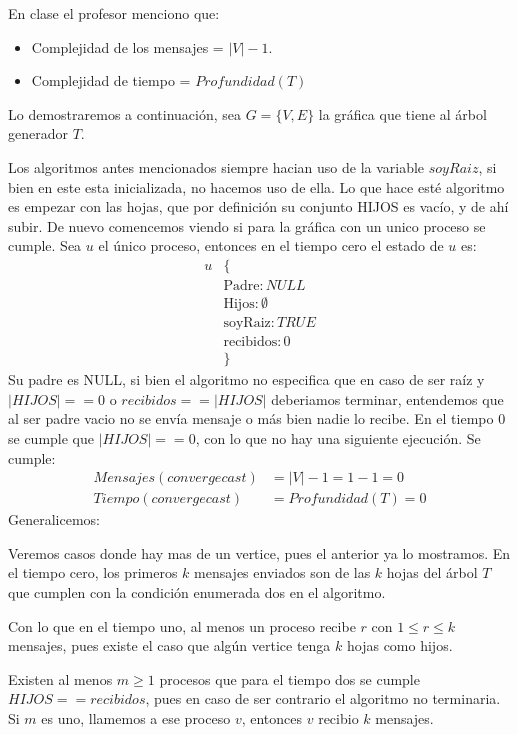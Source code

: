 \documentclass[8pt, letterpaper]{article}
\begin{document}
\begin{enumerate}
\begin{itemize}
  \hfill\break
  En clase el profesor menciono que:
  \begin{itemize}
  \item Complejidad de los mensajes = $|V|-1$.
  \item Complejidad de tiempo = $Profundidad(T)$
  \end{itemize}
  Lo demostraremos a continuación, sea $G=\{V,E\}$ la gráfica que tiene al
  árbol generador $T$.

  \hfill\break
  Los algoritmos antes mencionados siempre hacian uso de la variable $soyRaiz$,
  si bien en este esta inicializada, no hacemos uso de ella. Lo que hace esté
  algoritmo es empezar con las hojas, que por definición su conjunto HIJOS
  es vacío, y de ahí subir. De nuevo comencemos viendo si para la gráfica
  con un unico proceso se cumple. Sea $u$ el único proceso, entonces en el
  tiempo cero el estado de $u$ es:
  \begin{align*}
    u &\{\\
    &\text{Padre} : NULL\\
    &\text{Hijos} : \emptyset\\
    &\text{soyRaiz}: TRUE\\
    &\text{recibidos}: 0\\
    &\}
  \end{align*}
  Su padre es NULL, si bien el algoritmo no especifica que en caso de ser
  raíz y $|HIJOS|== 0$ o $recibidos == |HIJOS|$ deberiamos terminar,
  entendemos que al ser padre vacio no se envía mensaje o más bien nadie
  lo recibe. En el tiempo $0$ se cumple que $|HIJOS|==0$,
  con lo que no hay una siguiente ejecución. Se cumple:
  \begin{align*}
    Mensajes(convergecast) &= |V|-1 = 1-1 = 0\\
    Tiempo(convergecast) &= Profundidad(T) = 0
  \end{align*}
  \newpage
  Generalicemos:
  
  Veremos casos donde hay mas de un vertice, pues el anterior ya lo mostramos.
  En el tiempo cero, los  primeros $k$ mensajes enviados son de las $k$ hojas
  del árbol $T$ que cumplen con la condición enumerada dos en el algoritmo.

  Con lo que en el tiempo uno, al menos un proceso recibe $r$ con
  $1\leq r\leq k$ mensajes, pues existe el caso que algún vertice tenga
  $k$ hojas como hijos.

  Existen al menos $m\geq 1$ procesos que para el tiempo dos se cumple
  $HIJOS==recibidos$, pues en caso de ser contrario el algoritmo no terminaria.
  Si $m$ es uno, llamemos a ese proceso $v$, entonces $v$ recibio $k$ mensajes.


\end{itemize}
\end{enumerate}
\end{document}
